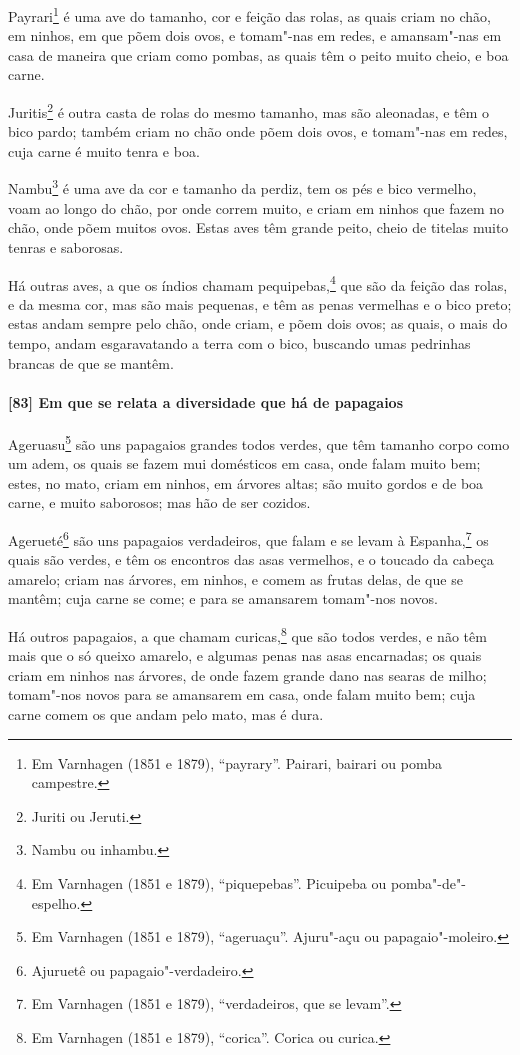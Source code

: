 Payrari\footnote{ Em Varnhagen (1851 e 1879), ``payrary''. Pairari, bairari ou pomba
campestre.} é uma ave do tamanho, cor e feição das rolas, as quais criam no chão, em
ninhos, em que põem dois ovos, e tomam"-nas em redes, e amansam"-nas em casa de maneira que
criam como pombas, as quais têm o peito muito cheio, e boa carne.

Juritis\footnote{ Juriti ou Jeruti.} é outra casta de rolas do mesmo tamanho, mas são
aleonadas, e têm o bico pardo; também criam no chão onde põem dois ovos, e tomam"-nas em
redes, cuja carne é muito tenra e boa.

Nambu\footnote{ Nambu ou inhambu.} é uma ave da cor e tamanho da perdiz, tem os pés e bico
vermelho, voam ao longo do chão, por onde correm muito, e criam em ninhos que fazem no
chão, onde põem muitos ovos. Estas aves têm grande peito, cheio de titelas muito tenras e
saborosas.

Há outras aves, a que os índios chamam pequipebas,\footnote{ Em Varnhagen (1851 e 1879),
``piquepebas''. Picuipeba ou pomba"-de"-espelho.} que são da feição das rolas, e da mesma
cor, mas são mais pequenas, e têm as penas vermelhas e o bico preto; estas andam sempre
pelo chão, onde criam, e põem dois ovos; as quais, o mais do tempo, andam esgaravatando a
terra com o bico, buscando umas pedrinhas brancas de que se mantêm.

\paragraph{[83] Em que se relata a diversidade que há de papagaios}\quad
Ageruasu\footnote{ Em Varnhagen (1851 e 1879), ``ageruaçu''. Ajuru"-açu ou
papagaio"-moleiro.} são uns papagaios grandes todos verdes, que têm tamanho corpo como um
adem, os quais se fazem mui domésticos em casa, onde falam muito bem; estes, no mato,
criam em ninhos, em árvores altas; são muito gordos e de boa carne, e muito saborosos; mas
hão de ser cozidos.

Agerueté\footnote{ Ajuruetê ou papagaio"-verdadeiro.} são uns papagaios verdadeiros, que
falam e se levam à Espanha,\footnote{ Em Varnhagen (1851 e 1879), ``verdadeiros, que se
levam''.} os quais são verdes, e têm os encontros das asas vermelhos, e o toucado da
cabeça amarelo; criam nas árvores, em ninhos, e comem as frutas delas, de que se mantêm;
cuja carne se come; e para se amansarem tomam"-nos novos.

Há outros papagaios, a que chamam curicas,\footnote{ Em Varnhagen (1851 e 1879),
``corica''. Corica ou curica.} que são todos verdes, e não têm mais que o só queixo
amarelo, e algumas penas nas asas encarnadas; os quais criam em ninhos nas árvores, de
onde fazem grande dano nas searas de milho; tomam"-nos novos para se amansarem em casa,
onde falam muito bem; cuja carne comem os que andam pelo mato, mas é dura.

